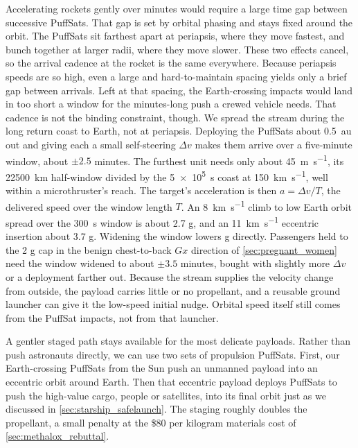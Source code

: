 \documentclass{article}
\newcommand{\deltav}{\Delta v}
\begin{document}
Accelerating rockets gently over minutes would require a large time gap between successive PuffSats. That gap is set by orbital phasing and stays fixed around the orbit. The PuffSats sit farthest apart at periapsis, where they move fastest, and bunch together at larger radii, where they move slower. These two effects cancel, so the arrival cadence at the rocket is the same everywhere. Because periapsis speeds are so high, even a large and hard-to-maintain spacing yields only a brief gap between arrivals. Left at that spacing, the Earth-crossing impacts would land in too short a window for the minutes-long push a crewed vehicle needs. That cadence is not the binding constraint, though. We spread the stream during the long return coast to Earth, not at periapsis. Deploying the PuffSats about \SI{0.5}{\astronomicalunit} out and giving each a small self-steering $\deltav$ makes them arrive over a five-minute window, about $\pm 2.5$ minutes. The furthest unit needs only about \SI{45}{\meter\per\second}, its \SI{22500}{\kilo\meter} half-window divided by the \SI{5e5}{\second} coast at \SI{150}{\kilo\meter\per\second}, well within a microthruster's reach. The target's acceleration is then $a = \deltav / T$, the delivered speed over the window length $T$. An \SI{8}{\kilo\meter\per\second} climb to low Earth orbit spread over the \SI{300}{\second} window is about 2.7 g, and an \SI{11}{\kilo\meter\per\second} eccentric insertion about 3.7 g. Widening the window lowers g directly. Passengers held to the 2 g cap in the benign chest-to-back $Gx$ direction of \autoref{sec:pregnant_women} need the window widened to about $\pm 3.5$ minutes, bought with slightly more $\deltav$ or a deployment farther out. Because the stream supplies the velocity change from outside, the payload carries little or no propellant, and a reusable ground launcher can give it the low-speed initial nudge. Orbital speed itself still comes from the PuffSat impacts, not from that launcher.   

A gentler staged path stays available for the most delicate payloads. Rather than push astronauts directly, we can use two sets of propulsion PuffSats. First, our Earth-crossing PuffSats from the Sun push an unmanned payload into an eccentric orbit around Earth. Then that eccentric payload deploys PuffSats to push the high-value cargo, people or satellites, into its final orbit just as we discussed in \autoref{sec:starship_safelaunch}. The staging roughly doubles the propellant, a small penalty at the \$80 per kilogram materials cost of \autoref{sec:methalox_rebuttal}.
\end{document}
